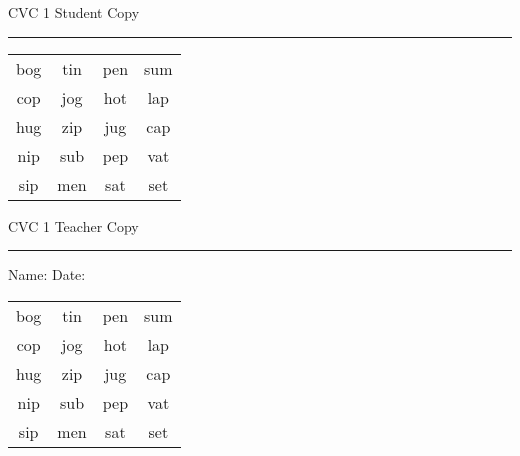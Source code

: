 \documentclass{memoir}
\begin{document}

\footnotesize \noindent
CVC 1 \hfill Student Copy
\smallskip
\hrule

\huge

\setlength{\tabcolsep}{14pt}
\def\arraystretch{2}

{\selectfont


\begin{vplace}[0.5]
\begin{center}
\begin{tabular}{cccc}
bog & tin & pen & sum \\
cop & jog & hot & lap \\
hug & zip & jug & cap \\
nip & sub & pep & vat \\
sip & men & sat & set \\
\end{tabular}
\end{center}
\end{vplace}

}

\newpage

\footnotesize \noindent
CVC 1 \hfill Teacher Copy
\smallskip
\hrule

\normalsize

\vfill

\noindent
Name: \underline{\hspace{1.75in}} \hfill Date: \underline{\hspace{1in}}

\huge

{\selectfont


\begin{vplace}[0.5]
\begin{center}
\begin{tabular}{cccc}
bog & tin & pen & sum \\
cop & jog & hot & lap \\
hug & zip & jug & cap \\
nip & sub & pep & vat \\
sip & men & sat & set \\
\end{tabular}
\end{center}
\end{vplace}



}
\end{document}
